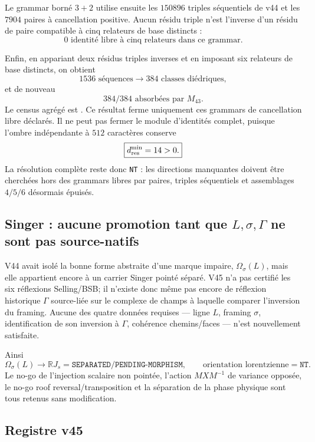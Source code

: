 \documentclass[11pt,a4paper]{article}
\newcommand{\certSeparated}{\texttt{SEPARATED}}
\newcommand{\certPending}{\texttt{PENDING-MORPHISM}}
\newcommand{\certNT}{\texttt{NT}}
\begin{document}
Le grammar borné $3+2$ utilise ensuite les $150896$ triples séquentiels de v44 et les $7904$ paires à cancellation positive. Aucun résidu triple n'est l'inverse d'un résidu de paire compatible à cinq relateurs de base distincts :
\[
 \boxed{0\text{ identité libre à cinq relateurs dans ce grammar}.}
\]

Enfin, en appariant deux résidus triples inverses et en imposant six relateurs de base distincts, on obtient
\[
 1536\text{ séquences}
 \longrightarrow
 \boxed{384\text{ classes diédriques},}
\]
et de nouveau
\[
 \boxed{384/384\text{ absorbées par }M_{43}.}
\]
Le census agrégé est . Ce résultat ferme uniquement ces grammars de cancellation libre déclarés. Il ne peut pas fermer le module d'identités complet, puisque l'ombre indépendante à $512$ caractères conserve
\[
 \boxed{d_{\rm res}^{\min}=14>0.}
\]
La résolution complète reste donc \certNT{} : les directions manquantes doivent être cherchées hors des grammars libres par paires, triples séquentiels et assemblages $4/5/6$ désormais épuisés.

\subsection{Singer : aucune promotion tant que $L,\sigma,\Gamma$ ne sont pas source-natifs}

V44 avait isolé la bonne forme abstraite d'une marque impaire, $\Omega_\sigma(L)$, mais elle appartient encore à un carrier Singer pointé séparé. V45 n'a pas certifié les six réflexions Selling/BSB; il n'existe donc même pas encore de réflexion historique $\Gamma$ source-liée sur le complexe de champs à laquelle comparer l'inversion du framing. Aucune des quatre données requises --- ligne $L$, framing $\sigma$, identification de son inversion à $\Gamma$, cohérence chemins/faces --- n'est nouvellement satisfaite.

Ainsi
\[
 \boxed{
 \Omega_\sigma(L)\to\mathbb R J_s
 =\certSeparated/\certPending,
 \qquad
 \text{orientation lorentzienne}=\certNT.}
\]
Le no-go de l'injection scalaire non pointée, l'action $MXM^{-1}$ de variance opposée, le no-go roof reversal/transposition et la séparation de la phase physique sont tous retenus sans modification.

\subsection{Registre v45}
\end{document}
